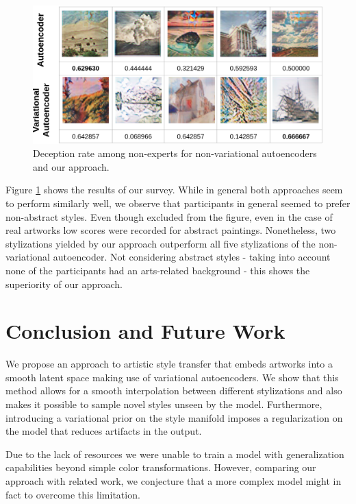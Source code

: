 \documentclass[10pt,twocolumn,letterpaper]{article}
\begin{document}
\begin{figure}
\centering
\includegraphics[width=0.9\linewidth]{survey.png}
\caption{Deception rate among non-experts for non-variational autoencoders and our approach.}
\label{fig:survey}
\end{figure}

Figure \ref{fig:survey} shows the results of our survey. While in general both approaches seem to perform similarly well, we observe that participants in general seemed to prefer non-abstract styles. Even though excluded from the figure, even in the case of real artworks low scores were recorded for abstract paintings. Nonetheless, two stylizations yielded by our approach outperform all five stylizations of the non-variational autoencoder. Not considering abstract styles - taking into account none of the participants had an arts-related background - this shows the superiority of our approach. 


\section{Conclusion and Future Work}

We propose an approach to artistic style transfer that embeds artworks into a smooth latent space making use of variational autoencoders. We show that this method allows for a smooth interpolation between different stylizations and also makes it possible to sample novel styles unseen by the model. Furthermore, introducing a variational prior on the style manifold imposes a regularization on the model that reduces artifacts in the output. 

Due to the lack of resources we were unable to train a model with generalization capabilities beyond simple color transformations. However, comparing our approach with related work, we conjecture that a more complex model might in fact to overcome this limitation.

{\small


}
\end{document}
